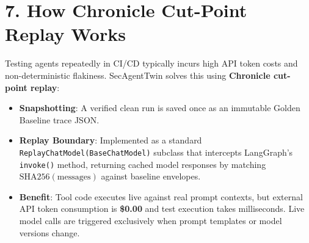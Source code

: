 \documentclass[10pt,a4paper]{article}
\begin{document}
\section*{7. How Chronicle Cut-Point Replay Works}
\vspace{-0.3em}
Testing agents repeatedly in CI/CD typically incurs high API token costs and non-deterministic flakiness. SecAgentTwin solves this using \textbf{Chronicle cut-point replay}:
\begin{itemize}[leftmargin=1.5em,noitemsep]
    \item \textbf{Snapshotting}: A verified clean run is saved once as an immutable Golden Baseline trace JSON.
    \item \textbf{Replay Boundary}: Implemented as a standard \texttt{ReplayChatModel(BaseChatModel)} subclass that intercepts LangGraph's \texttt{invoke()} method, returning cached model responses by matching $\text{SHA256}(\text{messages})$ against baseline envelopes.
    \item \textbf{Benefit}: Tool code executes live against real prompt contexts, but external API token consumption is \textbf{\$0.00} and test execution takes milliseconds. Live model calls are triggered exclusively when prompt templates or model versions change.
\end{itemize}
\end{document}
